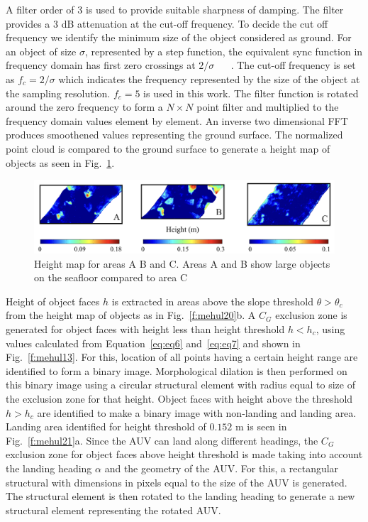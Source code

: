 A filter order of $3$ is used to provide suitable sharpness of damping. The filter provides a $3$ dB attenuation at the cut-off frequency. To decide the cut off frequency we identify the minimum size of the object considered as ground. For an object of size $\sigma$, represented by a step function, the equivalent sync function in frequency domain has first zero crossings at $2/\sigma$ ~\cite{Lyons1997} ~\cite{Kalogerakis2010}. The cut-off frequency is set as $f_c = 2/\sigma$ which indicates the frequency represented by the size of the object at the sampling resolution. $f_c = 5$ is used in this work. The filter function is rotated around the zero frequency to form a $N\times N$ point filter and multiplied to the frequency domain values element by element. An inverse two dimensional FFT produces smoothened values representing the ground surface. The normalized point cloud is compared to the ground surface to generate a height map of objects as seen in Fig.~\ref{f:mehul19}.

\begin{figure}[!ht]
\centering
\includegraphics[width=6in]{./images/mehul19.png}
\caption{Height map for areas A B and C. Areas A and B show large objects on the seafloor compared to area C}
\label{f:mehul19}
\end{figure}

Height of object faces $h$ is extracted in areas above the slope threshold $\theta > \theta_c$ from the height map of objects as in Fig.~\ref{f:mehul20}b. A $C_G$ exclusion zone is generated for object faces with height less than height threshold $h < h_c$, using values calculated from Equation~\ref{eq:eq6} and~\ref{eq:eq7} and shown in Fig.~\ref{f:mehul13}. For this, location of all points having a certain height range are identified to form a binary image. Morphological dilation is then performed on this binary image using a circular structural element with radius equal to size of the exclusion zone for that height. Object faces with height above the threshold $h > h_c$ are identified to make a binary image with non-landing and landing area. Landing area identified for height threshold of $0.152$ m is seen in Fig.~\ref{f:mehul21}a. Since the AUV can land along different headings, the $C_G$ exclusion zone for object faces above height threshold is made taking into account the landing heading $\alpha$ and the geometry of the AUV. For this, a rectangular structural with dimensions in pixels equal to the size of the AUV is generated. The structural element is then rotated to the landing heading to generate a new structural element representing the rotated AUV.


